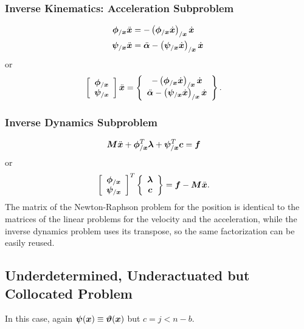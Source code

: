 \subsubsection{Inverse Kinematics: Acceleration Subproblem}
\begin{subequations}
\begin{align}
	\bm{\phi}_{/\bm{x}} \ddot{\bm{x}}
	&=
	-\left( \bm{\phi}_{/\bm{x}} \dot{\bm{x}} \right)_{/\bm{x}} \dot{\bm{x}}
	\\
	\bm{\psi}_{/\bm{x}} \ddot{\bm{x}}
	&=
	\ddot{\bm{\alpha}}
	-
	\left( \bm{\psi}_{/\bm{x}} \dot{\bm{x}} \right)_{/\bm{x}} \dot{\bm{x}}
\end{align}
\end{subequations}
or
\begin{align}
	\left[ \begin{array}{c} 
		\bm{\phi}_{/\bm{x}}
		\\
		\bm{\psi}_{/\bm{x}}
	 \end{array} \right] \ddot{\bm{x}}
	&=
	\left\{ \begin{array}{c} 
		-\left( \bm{\phi}_{/\bm{x}} \dot{\bm{x}} \right)_{/\bm{x}} \dot{\bm{x}}
		\\
		\ddot{\bm{\alpha}}
		-
		\left( \bm{\psi}_{/\bm{x}} \dot{\bm{x}} \right)_{/\bm{x}} \dot{\bm{x}}
	 \end{array} \right\}
	.
\end{align}

\subsubsection{Inverse Dynamics Subproblem}
\begin{align}
	\bm{M} \ddot{\bm{x}}
	+
	\bm{\phi}_{/\bm{x}}^T \bm{\lambda}
	+
	\bm{\psi}_{/\bm{x}}^T \bm{c}
	&=
	\bm{f}
	\label{eq:id:fap:ids}
\end{align}
or
\begin{align}
	\left[ \begin{array}{c} 
		\bm{\phi}_{/\bm{x}}
		\\
		\bm{\psi}_{/\bm{x}}
	 \end{array} \right]^T \left\{ \begin{array}{c} 
		\bm{\lambda}
		\\
		\bm{c}
	 \end{array} \right\}
	&=
	\bm{f}
	-
	\bm{M} \ddot{\bm{x}}
	\label{eq:id:fdp}
	.
\end{align}
The matrix of the Newton-Raphson problem for the position
is identical to the matrices of the linear problems for the velocity
and the acceleration, while the inverse dynamics problem uses its transpose,
so the same factorization can be easily reused.



\subsection{Underdetermined, Underactuated but Collocated Problem}
\label{sec:id:uucp}
In this case, again $\bm{\psi}(\bm{x}) \equiv \bm{\vartheta}(\bm{x})$
but $c = j < n - b$.

